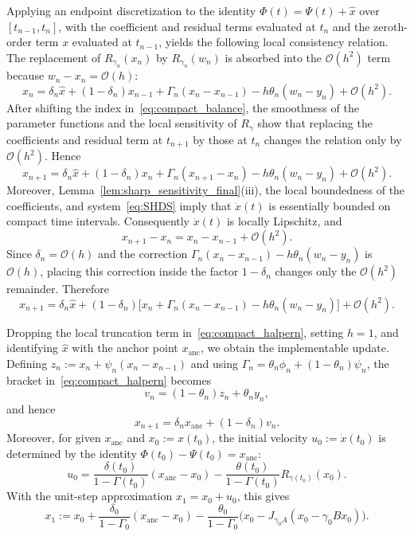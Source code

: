\documentclass{article}
\theoremstyle{definition}
\theoremstyle{definition}
\theoremstyle{definition}
\begin{document}
Applying an endpoint discretization to the identity \(\Phi(t)=\Psi(t)+\hat{x}\) over \([t_{n-1},t_n]\), with the coefficient and residual terms evaluated at \(t_n\) and the zeroth-order term \(x\) evaluated at \(t_{n-1}\), yields the following local consistency relation. The replacement of \(R_{\gamma_n}(x_n)\) by \(R_{\gamma_n}(w_n)\) is absorbed into the \(\mathcal O(h^2)\) term because \(w_n-x_n=\mathcal O(h)\):
\begin{equation}\label{eq:compact_balance}
x_n=\delta_n\hat{x}+(1-\delta_n)x_{n-1}
+\Gamma_n(x_n-x_{n-1})-h\theta_n(w_n-y_n)+\mathcal O(h^2).
\end{equation}
After shifting the index in~\eqref{eq:compact_balance}, the smoothness of the parameter functions and the local sensitivity of \(R_\gamma\) show that replacing the coefficients and residual term at \(t_{n+1}\) by those at \(t_n\) changes the relation only by \(\mathcal O(h^2)\). Hence
\[
x_{n+1}=\delta_n\hat{x}+(1-\delta_n)x_n
+\Gamma_n(x_{n+1}-x_n)-h\theta_n(w_n-y_n)+\mathcal O(h^2).
\]
Moreover, Lemma~\ref{lem:sharp_sensitivity_final}(iii), the local boundedness of the coefficients, and system~\eqref{eq:SHDS} imply that \(\ddot{x}(t)\) is essentially bounded on compact time intervals. Consequently \(\dot{x}(t)\) is locally Lipschitz, and
\[
x_{n+1}-x_n=x_n-x_{n-1}+\mathcal O(h^2).
\]
Since \(\delta_n=\mathcal O(h)\) and the correction \(\Gamma_n(x_n-x_{n-1})-h\theta_n(w_n-y_n)\) is \(\mathcal O(h)\), placing this correction inside the factor \(1-\delta_n\) changes only the \(\mathcal O(h^2)\) remainder. Therefore
\begin{equation}\label{eq:compact_halpern}
x_{n+1}=\delta_n\hat{x}+(1-\delta_n)
\Big[x_n+\Gamma_n(x_n-x_{n-1})-h\theta_n(w_n-y_n)\Big]+\mathcal O(h^2).
\end{equation}

Dropping the local truncation term in~\eqref{eq:compact_halpern}, setting \(h=1\), and identifying \(\hat{x}\) with the anchor point \(x_{\mathrm{anc}}\), we obtain the implementable update. Defining $z_n:=x_n+\psi_n(x_n-x_{n-1})$ and using \(\Gamma_n=\theta_n\phi_n+(1-\theta_n)\psi_n\), the bracket in~\eqref{eq:compact_halpern} becomes
\[
v_n=(1-\theta_n)z_n+\theta_n y_n,
\]
and hence
\[
x_{n+1}=\delta_nx_{\mathrm{anc}}+(1-\delta_n)v_n.
\]
Moreover, for given \(x_{\mathrm{anc}}\) and \(x_0:=x(t_0)\), the initial velocity \(u_0:=\dot{x}(t_0)\) is determined by the identity \(\Phi(t_0)-\Psi(t_0)=x_{\mathrm{anc}}\):
\[
u_0=\frac{\delta(t_0)}{1-\Gamma(t_0)}(x_{\mathrm{anc}}-x_0)
-\frac{\theta(t_0)}{1-\Gamma(t_0)}R_{\gamma(t_0)}(x_0).
\]
With the unit-step approximation \(x_1=x_0+u_0\), this gives
\[
x_1:=x_0+\frac{\delta_0}{1-\Gamma_0}(x_{\mathrm{anc}}-x_0)
-\frac{\theta_0}{1-\Gamma_0}\bigl(x_0-J_{\gamma_0A}(x_0-\gamma_0Bx_0)\bigr).
\]
\end{document}
